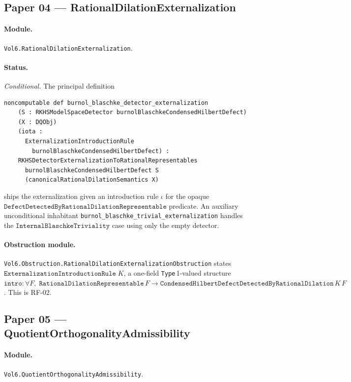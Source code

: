 \documentclass[11pt]{article}
\theoremstyle{plain}
\theoremstyle{definition}
\theoremstyle{remark}
\newcommand{\code}[1]{\texttt{#1}}
\begin{document}
\subsection{Paper 04 --- RationalDilationExternalization}
\label{sec:p04}

\paragraph{Module.}
\code{Vol6.RationalDilationExternalization}.

\paragraph{Status.}
\emph{Conditional.} The principal definition
\begin{lstlisting}
noncomputable def burnol_blaschke_detector_externalization
    (S : RKHSModelSpaceDetector burnolBlaschkeCondensedHilbertDefect)
    (X : DQObj)
    (iota :
      ExternalizationIntroductionRule
        burnolBlaschkeCondensedHilbertDefect) :
    RKHSDetectorExternalizationToRationalRepresentables
      burnolBlaschkeCondensedHilbertDefect S
      (canonicalRationalDilationSemantics X)
\end{lstlisting}
ships the externalization given an introduction rule \(\iota\) for the
opaque \(\code{DefectDetectedByRationalDilationRepresentable}\)
predicate.  An auxiliary unconditional inhabitant
\code{burnol\_blaschke\_trivial\_externalization} handles the
\(\code{InternalBlaschkeTriviality}\) case using only the empty detector.

\paragraph{Obstruction module.}
\code{Vol6.Obstruction.RationalDilationExternalizationObstruction}
states \(\code{ExternalizationIntroductionRule}\;K\), a one-field
\code{Type}\,1-valued structure
\(\code{intro} : \forall F,\;\code{RationalDilationRepresentable}\,F
   \to \code{CondensedHilbertDefectDetectedByRationalDilation}\,K\,F\).
This is RF-02.

\subsection{Paper 05 --- QuotientOrthogonalityAdmissibility}
\label{sec:p05}

\paragraph{Module.}
\code{Vol6.QuotientOrthogonalityAdmissibility}.
\end{document}
